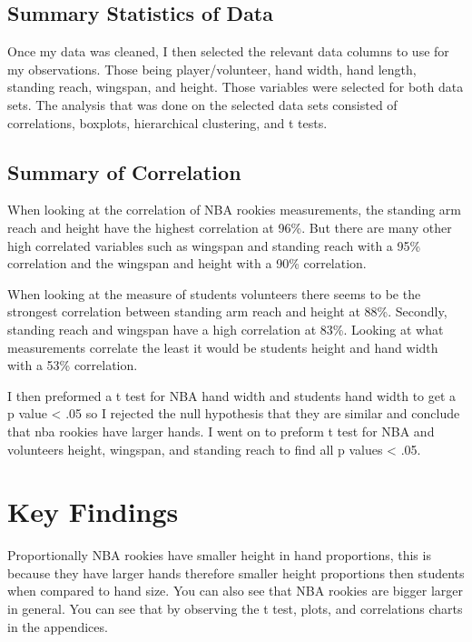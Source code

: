 \documentclass[]{article}
\begin{document}
\subsection{Summary Statistics of Data}
\label{sec:data-summary}

Once my data was cleaned, I then selected the relevant data columns to
use for my observations. Those being player/volunteer, hand width, hand
length, standing reach, wingspan, and height. Those variables were
selected for both data sets. The analysis that was done on the selected
data sets consisted of correlations, boxplots, hierarchical clustering,
and t tests.

\newpage

             


\subsection{Summary of Correlation}
\label{sec:correlation}

When looking at the correlation of NBA rookies measurements, the
standing arm reach and height have the highest correlation at 96\%. But
there are many other high correlated variables such as wingspan and
standing reach with a 95\% correlation and the wingspan and height with
a 90\% correlation. \newline

\noindent When looking at the measure of students volunteers there seems
to be the strongest correlation between standing arm reach and height at
88\%. Secondly, standing reach and wingspan have a high correlation at
83\%. Looking at what measurements correlate the least it would be
students height and hand width with a 53\% correlation. \newline

\noindent I then preformed a t test for NBA hand width and students hand
width to get a p value \textless{} .05 so I rejected the null hypothesis
that they are similar and conclude that nba rookies have larger hands. I
went on to preform t test for NBA and volunteers height, wingspan, and
standing reach to find all p values \textless{} .05.

\section{Key Findings}
\label{sec:findings}

Proportionally NBA rookies have smaller height in hand proportions, this
is because they have larger hands therefore smaller height proportions
then students when compared to hand size. You can also see that NBA
rookies are bigger larger in general. You can see that by observing the
t test, plots, and correlations charts in the appendices. \newline
\end{document}
